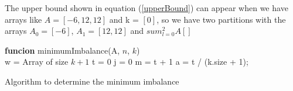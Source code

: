 \documentclass[tikz, 12pt]{scrartcl}
\begin{document}
\begin{enumerate}
\begin{enumerate}
The upper bound shown in equation (\ref{upperBound}) can appear when we have arrays like $A = [-6, 12, 12]$ and k = $[0]$, so we have two partitions with the arrays $A_0 =[-6]$, $A_1 = [12,12]$ and $sum_{l=0}^2A[]$
		
		\begin{algorithm}[th!]
	{\bf funcion} minimumImbalance(A, $n$, $k$)\\
	w = Array of size $k + 1$ 
	t = 0 
	j = 0 
	m = t + 1 
	a = t / (k.size + 1);
\caption{Algorithm to determine the minimum imbalance}
\label{minimumImbalance}
\end{algorithm}


\end{enumerate}
\end{enumerate}
\end{document}
